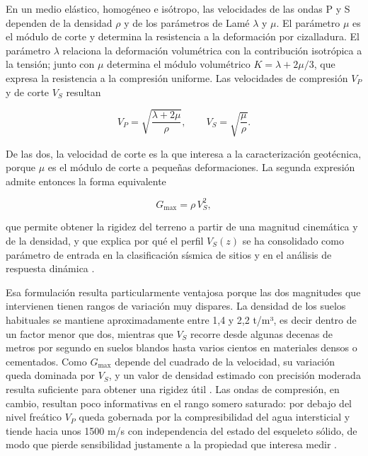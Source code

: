En un medio elástico, homogéneo e isótropo, las velocidades de las ondas P y S dependen de la densidad $\rho$ y de los parámetros de Lamé $\lambda$ y $\mu$. El parámetro $\mu$ es el módulo de corte y determina la resistencia a la deformación por cizalladura. El parámetro $\lambda$ relaciona la deformación volumétrica con la contribución isotrópica a la tensión; junto con $\mu$ determina el módulo volumétrico $K=\lambda+2\mu/3$, que expresa la resistencia a la compresión uniforme. Las velocidades de compresión $V_P$ y de corte $V_S$ resultan

\begin{equation}
V_P=\sqrt{\frac{\lambda+2\mu}{\rho}},
\qquad
V_S=\sqrt{\frac{\mu}{\rho}} .
\end{equation}

De las dos, la velocidad de corte es la que interesa a la caracterización geotécnica, porque $\mu$ es el módulo de corte a pequeñas deformaciones. La segunda expresión admite entonces la forma equivalente

\begin{equation}
G_{\max}=\rho\,V_S^{2},
\end{equation}

que permite obtener la rigidez del terreno a partir de una magnitud cinemática y de la densidad, y que explica por qué el perfil $V_S(z)$ se ha consolidado como parámetro de entrada en la clasificación sísmica de sitios y en el análisis de respuesta dinámica \citep{Kramer1996,Foti2014}.

Esa formulación resulta particularmente ventajosa porque las dos magnitudes que intervienen tienen rangos de variación muy dispares. La densidad de los suelos habituales se mantiene aproximadamente entre 1,4 y 2,2 t/m³, es decir dentro de un factor menor que dos, mientras que $V_S$ recorre desde algunas decenas de metros por segundo en suelos blandos hasta varios cientos en materiales densos o cementados. Como $G_{\max}$ depende del cuadrado de la velocidad, su variación queda dominada por $V_S$, y un valor de densidad estimado con precisión moderada resulta suficiente para obtener una rigidez útil \citep{Kramer1996,Foti2014}. Las ondas de compresión, en cambio, resultan poco informativas en el rango somero saturado: por debajo del nivel freático $V_P$ queda gobernada por la compresibilidad del agua intersticial y tiende hacia unos 1500 m/s con independencia del estado del esqueleto sólido, de modo que pierde sensibilidad justamente a la propiedad que interesa medir \citep{Foti2014,Foti2018}.

